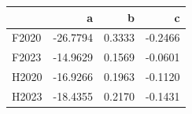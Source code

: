 \begin{tabular}{lrrr}
\toprule
 & a & b & c \\
\midrule
F2020 & -26.7794 & 0.3333 & -0.2466 \\
F2023 & -14.9629 & 0.1569 & -0.0601 \\
H2020 & -16.9266 & 0.1963 & -0.1120 \\
H2023 & -18.4355 & 0.2170 & -0.1431 \\
\bottomrule
\end{tabular}
